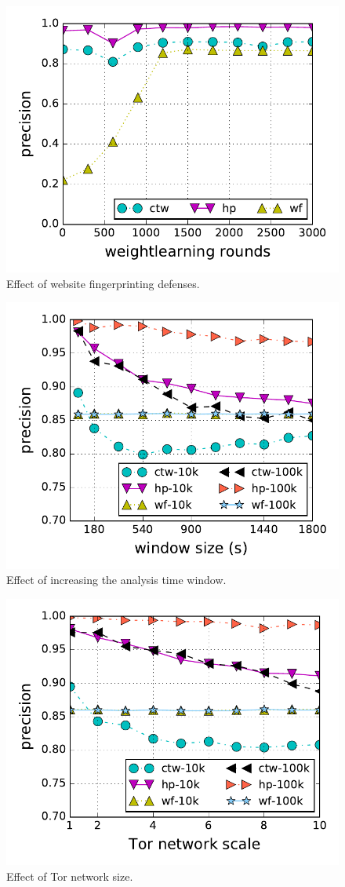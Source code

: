 \begin{figure}[t]
\centering
\includegraphics[width=0.75\linewidth]{figures/wfdns/rounds/1kx100+100k}
\caption{Effect of website fingerprinting defenses.}
\label{fig:wfdns:var:rounds}
\end{figure}

\begin{figure}[t]
\centering
\includegraphics[width=0.75\linewidth]{figures/wfdns/window/1kx100+100k}
\caption{Effect of increasing the analysis time window.}
    \label{fig:wfdns:var:window}
\end{figure}



\begin{figure}[t]
\centering
	\includegraphics[width=0.75\linewidth]{figures/wfdns/scale/1kx100+100k}
\caption{Effect of Tor network size.}
\label{fig:wfdns:var:scale}
\end{figure}


